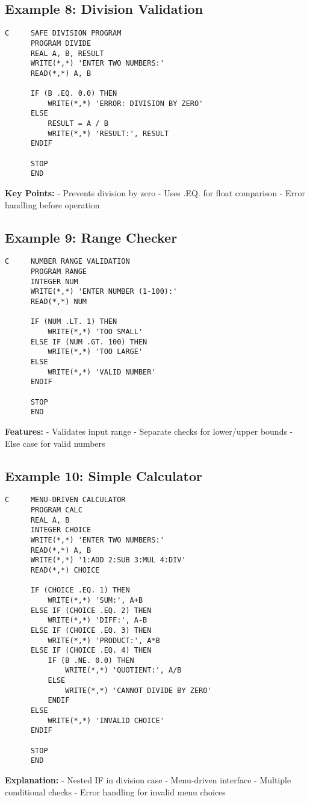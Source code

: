 \documentclass{book}
\begin{document}
\subsection*{Example 8: Division Validation}
\begin{verbatim}
C     SAFE DIVISION PROGRAM
      PROGRAM DIVIDE
      REAL A, B, RESULT
      WRITE(*,*) 'ENTER TWO NUMBERS:'
      READ(*,*) A, B
      
      IF (B .EQ. 0.0) THEN
          WRITE(*,*) 'ERROR: DIVISION BY ZERO'
      ELSE
          RESULT = A / B
          WRITE(*,*) 'RESULT:', RESULT
      ENDIF
      
      STOP
      END
\end{verbatim}
\textbf{Key Points:}
- Prevents division by zero
- Uses .EQ. for float comparison
- Error handling before operation

\subsection*{Example 9: Range Checker}
\begin{verbatim}
C     NUMBER RANGE VALIDATION
      PROGRAM RANGE
      INTEGER NUM
      WRITE(*,*) 'ENTER NUMBER (1-100):'
      READ(*,*) NUM
      
      IF (NUM .LT. 1) THEN
          WRITE(*,*) 'TOO SMALL'
      ELSE IF (NUM .GT. 100) THEN
          WRITE(*,*) 'TOO LARGE'
      ELSE
          WRITE(*,*) 'VALID NUMBER'
      ENDIF
      
      STOP
      END
\end{verbatim}
\textbf{Features:}
- Validates input range
- Separate checks for lower/upper bounds
- Else case for valid numbers

\subsection*{Example 10: Simple Calculator}
\begin{verbatim}
C     MENU-DRIVEN CALCULATOR
      PROGRAM CALC
      REAL A, B
      INTEGER CHOICE
      WRITE(*,*) 'ENTER TWO NUMBERS:'
      READ(*,*) A, B
      WRITE(*,*) '1:ADD 2:SUB 3:MUL 4:DIV'
      READ(*,*) CHOICE
      
      IF (CHOICE .EQ. 1) THEN
          WRITE(*,*) 'SUM:', A+B
      ELSE IF (CHOICE .EQ. 2) THEN
          WRITE(*,*) 'DIFF:', A-B
      ELSE IF (CHOICE .EQ. 3) THEN
          WRITE(*,*) 'PRODUCT:', A*B
      ELSE IF (CHOICE .EQ. 4) THEN
          IF (B .NE. 0.0) THEN
              WRITE(*,*) 'QUOTIENT:', A/B
          ELSE
              WRITE(*,*) 'CANNOT DIVIDE BY ZERO'
          ENDIF
      ELSE
          WRITE(*,*) 'INVALID CHOICE'
      ENDIF
      
      STOP
      END
\end{verbatim}
\textbf{Explanation:}
- Nested IF in division case
- Menu-driven interface
- Multiple conditional checks
- Error handling for invalid menu choices
\end{document}
